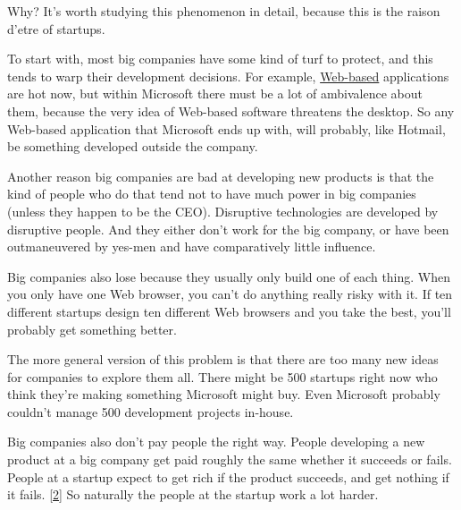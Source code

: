 Why? It's
                    worth studying this phenomenon in detail, because this is
                    the raison d'etre of startups.

To start with,
                    most big companies have some kind of turf to protect, and
                    this tends to warp their development decisions. For example,
                    \href{http://www.paulgraham.com/road.html}{Web-based} applications are hot now,
                    but within Microsoft there must be a lot of ambivalence
                    about them, because the very idea of Web-based software
                    threatens the desktop. So any Web-based application that
                    Microsoft ends up with, will probably, like Hotmail, be
                    something developed outside the company.

Another
                    reason big companies are bad at developing new products is
                    that the kind of people who do that tend not to have much
                    power in big companies (unless they happen to be the CEO).
                    Disruptive technologies are developed by disruptive people.
                    And they either don't work for the big company, or have been
                    outmaneuvered by yes-men and have comparatively little
                    influence.

Big companies also lose because they
                    usually only build one of each thing. When you only have one
                    Web browser, you can't do anything really risky with it. If
                    ten different startups design ten different Web browsers and
                    you take the best, you'll probably get something better.

The
                    more general version of this problem is that there are too
                    many new ideas for companies to explore them all. There
                    might be 500 startups right now who think they're making
                    something Microsoft might buy. Even Microsoft probably
                    couldn't manage 500 development projects in-house.

Big
                    companies also don't pay people the right way. People
                    developing a new product at a big company get paid roughly
                    the same whether it succeeds or fails. People at a startup
                    expect to get rich if the product succeeds, and get nothing
                    if it fails.
                    [\href{\#f2n}{2}]
                    So naturally the people at the startup work a lot harder.

